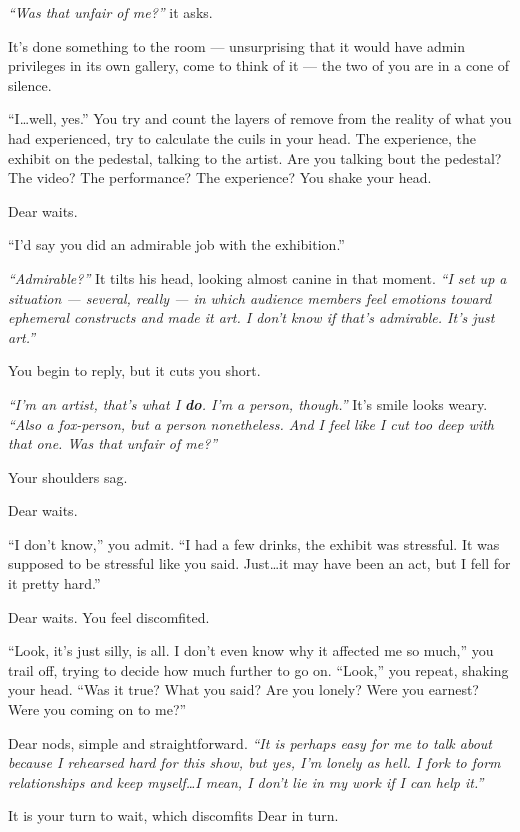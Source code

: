 \emph{``Was that unfair of me?''} it asks.

It's done something to the room --- unsurprising that it would have admin privileges in its own gallery, come to think of it --- the two of you are in a cone of silence.

``I\ldots{}well, yes.'' You try and count the layers of remove from the reality of what you had experienced, try to calculate the cuils in your head. The experience, the exhibit on the pedestal, talking to the artist. Are you talking bout the pedestal? The video? The performance? The experience? You shake your head.

Dear waits.

``I'd say you did an admirable job with the exhibition.''

\emph{``Admirable?''} It tilts his head, looking almost canine in that moment. \emph{``I set up a situation --- several, really --- in which audience members feel emotions toward ephemeral constructs and made it art. I don't know if that's admirable. It's just art.''}

You begin to reply, but it cuts you short.

\emph{``I'm an artist, that's what I \textbf{do}. I'm a person, though.''} It's smile looks weary. \emph{``Also a fox-person, but a person nonetheless. And I feel like I cut too deep with that one. Was that unfair of me?''}

Your shoulders sag.

Dear waits.

``I don't know,'' you admit. ``I had a few drinks, the exhibit was stressful. It was supposed to be stressful like you said. Just\ldots{}it may have been an act, but I fell for it pretty hard.''

Dear waits. You feel discomfited.

``Look, it's just silly, is all. I don't even know why it affected me so much,'' you trail off, trying to decide how much further to go on. ``Look,'' you repeat, shaking your head. ``Was it true? What you said? Are you lonely? Were you earnest? Were you coming on to me?''

Dear nods, simple and straightforward. \emph{``It is perhaps easy for me to talk about because I rehearsed hard for this show, but yes, I'm lonely as hell. I fork to form relationships and keep myself\ldots{}I mean, I don't lie in my work if I can help it.''}

It is your turn to wait, which discomfits Dear in turn.

